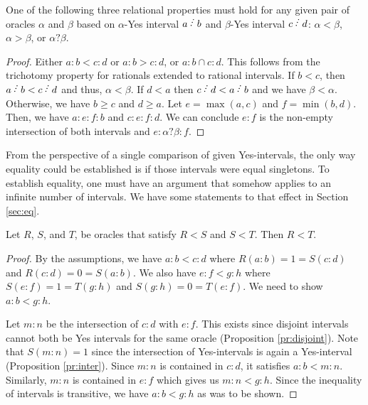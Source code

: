 \documentclass[12pt]{article}
\begin{document}
\begin{proposition}
One of the following three relational properties must hold for any given pair of oracles $\alpha$ and $\beta$ based on $\alpha$-Yes interval $a\lte b$ and $\beta$-Yes interval $c\lte d$: $\alpha < \beta$,  $\alpha > \beta$, or $\alpha ? \beta$. 
\end{proposition}

\begin{proof}
     Either $a:b < c:d$ or $a:b > c:d$, or $a:b \cap c:d$. This follows from the trichotomy property for rationals extended to rational intervals. If $b < c$, then $a \lte b < c \lte d$ and thus, $\alpha < \beta$. If $d < a$   then $c\lte d < a \lte b$ and we have $\beta < \alpha$. Otherwise, we have $b \geq c$ and $d \geq a$. Let $e= \max(a,c)$ and $f = \min(b,d)$. Then, we have $a:e:f:b$ and $c:e:f:d$. We can conclude $e:f$ is the non-empty intersection of both intervals and $e:\alpha ? \beta:f$. 
\end{proof}

From the perspective of a single comparison of given Yes-intervals, the only way equality could be established is if those intervals were equal singletons. To establish equality, one must have an argument that somehow applies to an infinite number of intervals. We have some statements to that effect in Section \ref{sec:eq}. 

\begin{proposition}\label{pr:transitive}
Let $R$, $S$, and $T$, be oracles that satisfy $R<S$ and $S < T$. Then $R < T$.
\end{proposition}

\begin{proof}
By the assumptions, we have $a:b < c:d$ where $R(a:b) = 1 = S(c:d)$ and $R(c:d) = 0 = S(a:b)$. We also have $e:f < g:h$ where $S(e:f) = 1 = T(g:h)$ and $S(g:h) = 0 = T(e:f)$. We need to show $a:b < g:h$.

Let $m:n$ be the intersection of $c:d$ with $e:f$. This exists since disjoint intervals cannot both be Yes intervals for the same oracle (Proposition \ref{pr:disjoint}). Note that $S(m:n) = 1$ since the intersection of Yes-intervals is again a Yes-interval (Proposition \ref{pr:inter}). Since $m:n$ is contained in $c:d$, it satisfies $a:b < m:n$. Similarly, $m:n$ is contained in $e:f$ which gives us $m:n < g:h$. Since the inequality of intervals is transitive, we have $a:b < g:h$ as was to be shown. 
\end{proof}
\end{document}
